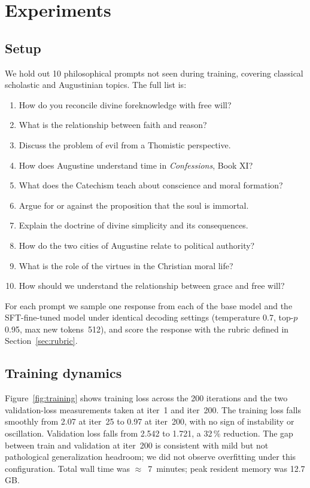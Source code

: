 \section{Experiments}
\label{sec:experiments}

\subsection{Setup}
\label{sec:setup}

We hold out 10 philosophical prompts not seen during training,
covering classical scholastic and Augustinian topics. The full list is:

\begin{enumerate}
  \item How do you reconcile divine foreknowledge with free will?
  \item What is the relationship between faith and reason?
  \item Discuss the problem of evil from a Thomistic perspective.
  \item How does Augustine understand time in \emph{Confessions}, Book XI?
  \item What does the Catechism teach about conscience and moral
        formation?
  \item Argue for or against the proposition that the soul is immortal.
  \item Explain the doctrine of divine simplicity and its consequences.
  \item How do the two cities of Augustine relate to political authority?
  \item What is the role of the virtues in the Christian moral life?
  \item How should we understand the relationship between grace and free
        will?
\end{enumerate}

For each prompt we sample one response from each of the base model and the
SFT-fine-tuned model under identical decoding settings (temperature 0.7,
top-$p$ 0.95, max new tokens~512), and score the response with the rubric
defined in Section~\ref{sec:rubric}.

\subsection{Training dynamics}
\label{sec:dynamics}

Figure~\ref{fig:training} shows training loss across the 200 iterations and
the two validation-loss measurements taken at iter~1 and iter~200. The
training loss falls smoothly from 2.07 at iter~25 to 0.97 at iter~200, with
no sign of instability or oscillation. Validation loss falls from 2.542 to
1.721, a 32\,\% reduction. The gap between train and validation at iter~200
is consistent with mild but not pathological generalization headroom; we
did not observe overfitting under this configuration. Total wall time was
$\approx$~7~minutes; peak resident memory was 12.7\,GB.

